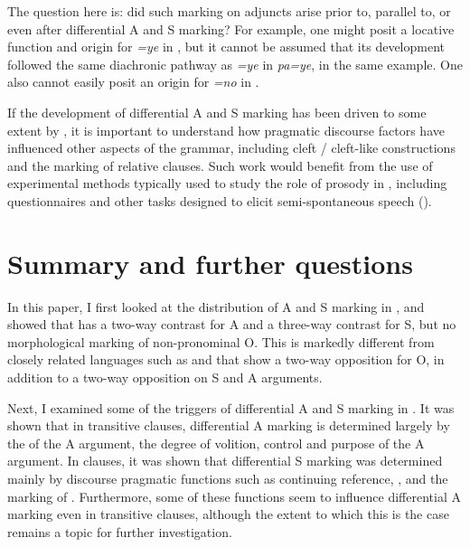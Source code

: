 \documentclass[output=paper]{LSP/langsci}
\begin{document}
The question here is: did such marking on adjuncts arise prior to, parallel to, or even after differential A and S marking? For example, one  might posit a locative function and origin for \textit{=ye} in , but it cannot be assumed that its development followed the same diachronic pathway as \textit{=ye} in \textit{pa=ye}, in the same example. One also cannot easily posit an origin for \textit{=no} in .

If the development of differential A and S marking has been driven to some extent by , it is important to understand how pragmatic discourse factors have influenced other aspects of the grammar, including cleft / cleft-like constructions and the marking of relative clauses. Such work would benefit from the use of experimental methods typically used to study the role of prosody in , including questionnaires and other tasks designed to elicit semi-spontaneous speech (\eg \citealt{Skopeteasetal2006Questionnaire,Hellmuthetal2007Intonational}).


\section{Summary and further questions}\label{13-te-sec:5}

In this paper, I first looked at the distribution of A and S marking in , and showed that  has a two-way contrast for A and a three-way contrast for S, but no morphological marking of non-pronominal O. This is markedly different from  closely related languages such as  and  that show a two-way opposition for O, in addition to a two-way opposition on S and A arguments.

Next, I examined some of the triggers of differential A and S marking in . It was shown that in transitive clauses, differential A marking is determined largely by the  of the A argument, \ie the degree of volition, control and purpose of the A argument. In  clauses, it was shown that differential S marking was determined mainly by discourse pragmatic functions such as continuing reference, , and the marking of . Furthermore, some of these functions seem to influence differential A marking even in transitive clauses, although the extent to which this is the case remains a topic for further investigation.
\end{document}
